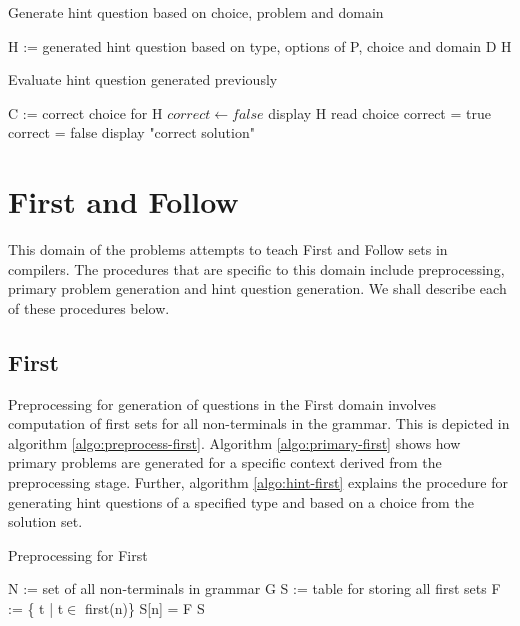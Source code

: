 \begin{algorithm}
\caption{Generate hint question based on choice, problem and domain}
\label{algo:generatehint}
\begin{algorithmic}[1]
\State H := generated hint question based on type, options of P, choice and domain D
\State \Return H
\EndFunction
\end{algorithmic}
\end{algorithm}

\begin{algorithm}
\caption{Evaluate hint question generated previously}
\label{algo:evaluatehint}
\begin{algorithmic}[1]
\Require C := correct choice for H
\State $correct \gets false$
\State display H
\State read choice
\State correct = true
\Else
\State correct = false
\EndIf
\EndWhile
\State display "correct solution"
\EndFunction
\end{algorithmic}
\end{algorithm}

\section{First and Follow}
\label{sec:firstandfollow}
This domain of the problems attempts to teach First and Follow sets in compilers. The procedures that are specific to this domain include preprocessing, primary problem generation and hint question generation. We shall describe each of these procedures below.

\subsection{First}
\label{subsec:ff-first}

Preprocessing for generation of questions in the First domain involves computation of first sets for all non-terminals in the grammar. This is depicted in algorithm \ref{algo:preprocess-first}. Algorithm \ref{algo:primary-first} shows how primary problems are generated for a specific context derived from the preprocessing stage. Further, algorithm \ref{algo:hint-first} explains the procedure for generating hint questions of a specified type and based on a choice from the solution set.

\begin{algorithm}
\caption{Preprocessing for First}
\label{algo:preprocess-first}
\begin{algorithmic}[1]
\State N := set of all non-terminals in grammar G
\State S := table for storing all first sets
\State F := \{ t | t$\in$ first(n)\}
\State S[n] = F
\EndFor
\State \Return S
\EndFunction
\end{algorithmic}
\end{algorithm}

